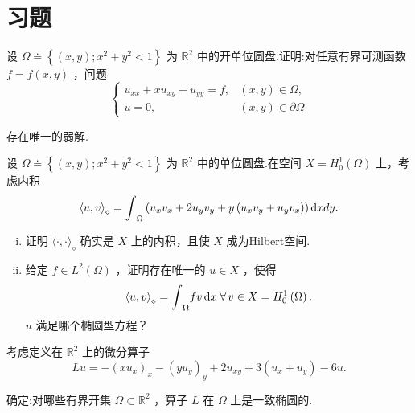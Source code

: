 \section{习题}

\begin{rbhw}[index=1]
设 $\Omega  \doteq  \left\{  {\left( {x,y}\right) ;{x}^{2} + {y}^{2} < 1}\right\}$ 为 ${\mathbb{R}}^{2}$ 中的开单位圆盘.证明:对任意有界可测函数 $f = f\left( {x,y}\right)$ ，问题
\[
\begin{cases}{u}_{xx} + x{u}_{xy} + {u}_{yy} = f,& (x,y)\in \Omega , \\  u = 0, & (x,y)\in \partial \Omega  \end{cases}
\]

存在唯一的弱解.
\end{rbhw}

\begin{rbhw}
设 $\Omega  \doteq  \left\{  {\left( {x,y}\right) ;{x}^{2} + {y}^{2} < 1}\right\}$ 为 ${\mathbb{R}}^{2}$ 中的单位圆盘.在空间 $X = {H}_{0}^{1}\left( \Omega \right)$ 上，考虑内积
\[
\langle u,v{\rangle }_{\diamond } = {\int }_{\Omega }\left(  {{u}_{x}{v}_{x} + 2{u}_{y}{v}_{y} + y\left( {{u}_{x}{v}_{y} + {u}_{y}{v}_{x}}\right) }\right)  {\mathop{}\!\mathrm{d} xdy}.
\]
\begin{enumerate}[(i)]
    \item 证明 $\langle  \cdot  , \cdot  {\rangle }_{\diamond }$ 确实是 $X$ 上的内积，且使 $X$ 成为Hilbert空间.
    \item 给定 $f \in  {L}^{2}\left( \Omega \right)$ ，证明存在唯一的 $u \in  X$ ，使得
\[
\langle u,v{\rangle }_{\diamond } = {\int }_{\Omega }{fv\mathop{}\!\mathrm{d} x}\;\forall\,v \in  X = {H}_{0}^{1}\left( \Omega \right) .
\]
$u$ 满足哪个椭圆型方程？
\end{enumerate}
\end{rbhw}

\begin{rbhw}
考虑定义在 ${\mathbb{R}}^{2}$ 上的微分算子
\[
{Lu} =  - {\left( x{u}_{x}\right) }_{x} - {\left( y{u}_{y}\right) }_{y} + 2{u}_{xy} + 3\left( {{u}_{x} + {u}_{y}}\right)  - {6u}.
\]

确定:对哪些有界开集 $\Omega  \subset  {\mathbb{R}}^{2}$ ，算子 $L$ 在 $\Omega$ 上是一致椭圆的.
\end{rbhw}

